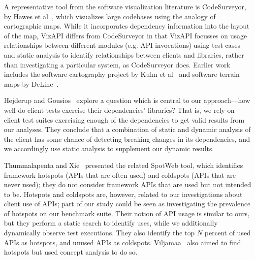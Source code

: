 \label{sec:related-work}
A representative tool from the software visualization literature is
CodeSurveyor, by Hawes et al~\cite{hawes15:_codes}, which visualizes large
codebases using the analogy of cartographic maps. While it
incorporates dependency information into the layout of the map, VizAPI
differs from CodeSurveyor in that VizAPI focusses on usage relationships
between different modules (e.g. API invocations) using test
cases and static analysis to identify relationships between clients and libraries, rather
than investigating a particular system, as CodeSurveyor does.  Earlier
work includes the software cartography project by Kuhn et
al~\cite{kuhn10:_softw} and software terrain maps by DeLine~\cite{deline05:_stayin}.




Hejderup and Gousios~\cite{DBLP:journals/jss/HejderupG22} explore a
question which is central to our approach---how well do client tests
exercise their dependencies' libraries? That is, we rely on
client test suites exercising enough of the dependencies to get valid
results from our analyses. They conclude that a combination of
static and dynamic analysis of the client has some chance of detecting
breaking changes in its dependencies, and we accordingly use static
analysis to supplement our dynamic results.

Thummalapenta and Xie~\cite{thummalapenta08:_spotw} presented the
related SpotWeb tool, which identifies framework hotspots (APIs that
are often used) and coldspots (APIs that are never used); they do not
consider framework APIs that are used but not intended to be. Hotspots
and coldspots are, however, related to our investigations about client
use of APIs; part of our study could be seen as investigating the
prevalence of hotspots on our benchmark suite. Their notion of API
usage is similar to ours, but they perform a static search to identify
uses, while we additionally dynamically observe test executions. They
also identify the top $N$ percent of used APIs as hotspots, and unused
APIs as
coldspots. Viljamaa~\cite{viljamaa03:_rever_engin_framew_reuse_inter}
also aimed to find hotspots but used concept analysis to do so.

